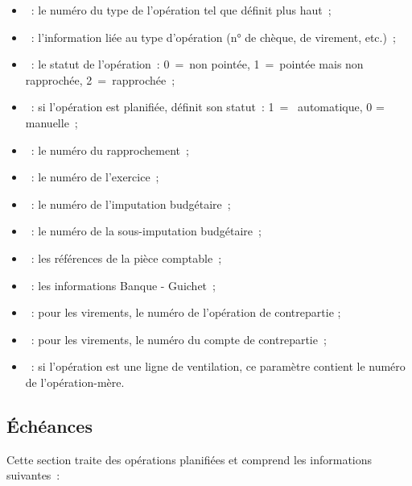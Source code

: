 \begin{itemize}
\item {}~: le numéro du type de l'opération tel que définit plus haut~;

\item {}~: l'information liée au type d'opération (n° de chèque, de 
virement,
etc.)~;

\item {}~: le statut de l'opération~: 0~=~non pointée, 1~=~pointée mais 
non 
rapprochée, 2~=~rapprochée~;

\item {}~: si l'opération est planifiée, définit son statut~: 1~=~
automatique, 0
= manuelle~;

\item {}~: le numéro du rapprochement~;

\item {}~: le numéro de l'exercice~;

\item {}~: le numéro de l'imputation budgétaire~;

\item {}~: le numéro de la sous-imputation budgétaire~;

\item {}~: les références de la pièce comptable~;

\item {}~: les informations Banque - Guichet~;

\item {}~: pour les virements, le numéro de l'opération de contrepartie 
;

\item {}~: pour les virements, le numéro du compte de contrepartie~;

\item {}~: si l'opération est une ligne de ventilation, ce paramètre 
contient le 
numéro de l'opération-mère.

\end{itemize}

\subsection{Échéances}

Cette section traite des opérations planifiées et comprend les informations
suivantes~:

